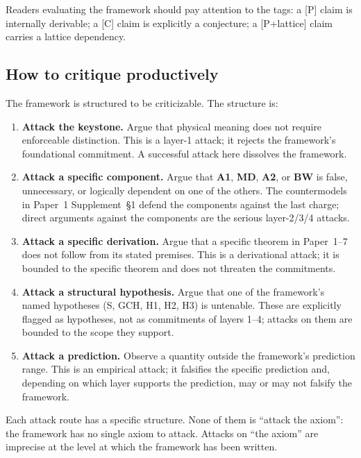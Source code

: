 \documentclass[11pt]{article}
\newcommand{\Aone}{\textbf{A1}}
\begin{document}
\noindent Readers evaluating the framework should pay attention to the tags: a [P] claim is internally derivable; a [C] claim is explicitly a conjecture; a [P+lattice] claim carries a lattice dependency.

\subsection{How to critique productively}\label{sec:how_to_critique}

The framework is structured to be criticizable. The structure is:

\begin{enumerate}
    \item \textbf{Attack the keystone.} Argue that physical meaning does not require enforceable distinction. This is a layer-1 attack; it rejects the framework's foundational commitment. A successful attack here dissolves the framework.
    \item \textbf{Attack a specific component.} Argue that \Aone{}, \textbf{MD}, \textbf{A2}, or \textbf{BW} is false, unnecessary, or logically dependent on one of the others. The countermodels in Paper~1 Supplement~\S1 defend the components against the last charge; direct arguments against the components are the serious layer-2/3/4 attacks.
    \item \textbf{Attack a specific derivation.} Argue that a specific theorem in Paper~1--7 does not follow from its stated premises. This is a derivational attack; it is bounded to the specific theorem and does not threaten the commitments.
    \item \textbf{Attack a structural hypothesis.} Argue that one of the framework's named hypotheses (S, GCH, H1, H2, H3) is untenable. These are explicitly flagged as hypotheses, not as commitments of layers 1--4; attacks on them are bounded to the scope they support.
    \item \textbf{Attack a prediction.} Observe a quantity outside the framework's prediction range. This is an empirical attack; it falsifies the specific prediction and, depending on which layer supports the prediction, may or may not falsify the framework.
\end{enumerate}

\noindent Each attack route has a specific structure. None of them is ``attack the axiom'': the framework has no single axiom to attack. Attacks on ``the axiom'' are imprecise at the level at which the framework has been written.
\end{document}
